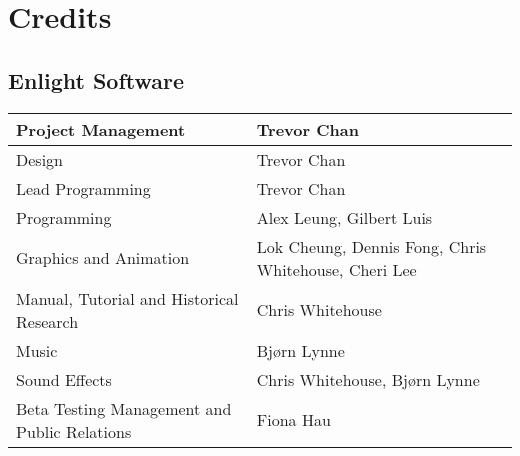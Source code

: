 
\chapter{Credits}

\section{Enlight Software}

\begin{tabular}{ | p{4cm} | p{9cm} |}
	\hline
	Project Management	& Trevor Chan \\ \hline
Design	& Trevor Chan \\ \hline
Lead Programming	& Trevor Chan \\ \hline
Programming	& Alex Leung, Gilbert Luis \\ \hline
Graphics and Animation	& Lok Cheung, Dennis Fong, Chris Whitehouse, Cheri Lee \\ \hline
Manual, Tutorial and Historical Research	& Chris Whitehouse \\ \hline
Music	& Bjørn Lynne \\ \hline
Sound Effects	& Chris Whitehouse, Bjørn Lynne \\ \hline
Beta Testing Management and Public Relations	& Fiona Hau \\ \hline
\hline
\end{tabular}

